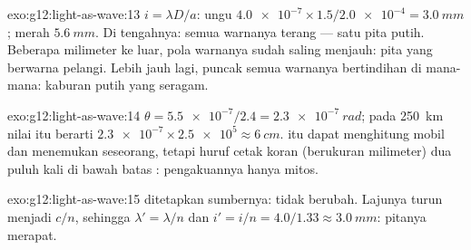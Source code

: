 \begin{solution}{exo:g12:light-as-wave:13}
$i = \lambda D/a$: ungu $\num{4.0e-7} \times 1.5/\num{2.0e-4} =
\qty{3.0}{mm}$; merah $\qty{5.6}{mm}$. Di tengahnya: semua warnanya
terang --- satu pita putih. Beberapa milimeter ke luar, pola warnanya
sudah saling menjauh: pita yang berwarna pelangi. Lebih jauh lagi,
puncak semua warnanya bertindihan di mana-mana: kaburan putih yang
seragam.
\end{solution}

\begin{solution}{exo:g12:light-as-wave:14}
$\theta = \num{5.5e-7}/2.4 = \qty{2.3e-7}{rad}$; pada \qty{250}{km}
nilai itu berarti $\num{2.3e-7} \times \num{2.5e5} \approx \qty{6}{cm}$.
 itu dapat menghitung mobil dan menemukan seseorang, tetapi
huruf cetak koran (berukuran milimeter) dua puluh kali di bawah batas
: pengakuannya hanya mitos.
\end{solution}

\begin{solution}{exo:g12:light-as-wave:15}
 ditetapkan sumbernya: tidak berubah. Lajunya turun menjadi
$c/n$, sehingga $\lambda' = \lambda/n$ dan
$i' = i/n = 4.0/1.33 \approx \qty{3.0}{mm}$: pitanya merapat.
\end{solution}

